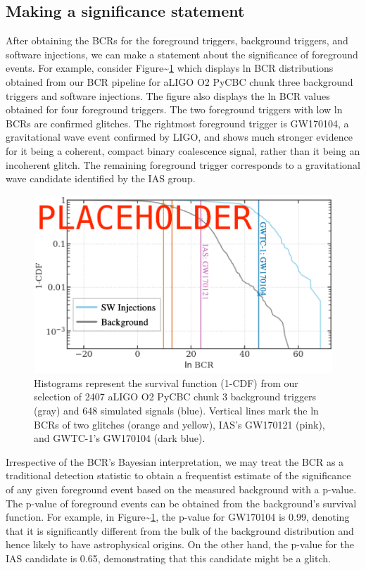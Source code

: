 \documentclass[%
 reprint,
 amsmath,amssymb,
 aps,
]{revtex4}
\begin{document}
\hypertarget{making-a-significance-statement}{%
\subsection{Making a significance statement}\label{making-a-significance-statement}}

After obtaining the BCRs for the foreground triggers, background triggers, and software injections, we can make a
statement about the significance of foreground events. For example, consider Figure\textasciitilde\ref{fig:bcrCdf} which displays ln
BCR distributions obtained from our BCR pipeline for aLIGO O2 PyCBC chunk three background triggers and software injections.
The figure also displays the ln BCR values obtained for four foreground triggers. The two foreground triggers with low
ln BCRs are confirmed glitches. The rightmost foreground trigger is GW170104, a gravitational wave event confirmed by
LIGO, and shows much stronger evidence for it being a coherent, compact binary coalescence signal, rather than it being
an incoherent glitch. The remaining foreground trigger corresponds to a gravitational wave candidate identified by the
IAS group.



\begin{figure}[!h]

{\centering \includegraphics[width=0.75\linewidth]{images/bcr_cdf} 

}

\caption[BCR distribution example]{Histograms represent the survival function (1-CDF) from our selection of 2407 aLIGO O2 PyCBC chunk 3 background triggers (gray) and 648 simulated signals (blue). Vertical lines mark the ln BCRs of two glitches (orange and yellow), IAS's GW170121 (pink), and GWTC-1's GW170104 (dark blue).}\label{fig:bcrCdf}
\end{figure}

Irrespective of the BCR's Bayesian interpretation, we may treat the BCR as a traditional detection statistic to obtain a
frequentist estimate of the significance of any given foreground event based on the measured background with a p-value.
The p-value of foreground events can be obtained from the background's survival function. For example, in
Figure\textasciitilde\ref{fig:bcrCdf}, the p-value for GW170104 is 0.99, denoting that it is significantly different from the bulk
of the background distribution and hence likely to have astrophysical origins. On the other hand, the p-value for the
IAS candidate is 0.65, demonstrating that this candidate might be a glitch.
\end{document}
